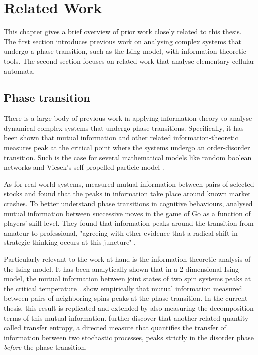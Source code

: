 \documentclass[12pt]{article}
\begin{document}
\newpage
\section{Related Work} 

This chapter gives a brief overview of prior work closely related to this thesis. The first section introduces previous work on analysing complex systems that undergo a phase transition, such as the Ising model, with information-theoretic tools. The second section focuses on related work that analyse elementary cellular automata.    

\subsection{Phase transition}

There is a large body of previous work in applying information theory to analyse dynamical complex systems that undergo phase transitions. Specifically, it has been shown that mutual information and other related information-theoretic measures peak at the critical point where the systems undergo an order-disorder transition. Such is the case for several mathematical models like random boolean networks \cite{lizier-rand-bool-nets} and Vicsek's self-propelled particle model \cite{mi-swarms}. 

As for real-world systems, \cite{mi-financial-markets} measured mutual information between pairs of selected stocks and found that the peaks in information take place around known market crashes. To better understand phase transitions in cognitive behaviours, \cite{mi-go} analysed mutual information between successive moves in the game of Go as a function of players' skill level. They found that information peaks around the transition from amateur to professional, "agreeing with other evidence that a radical shift in strategic thinking occurs at this juncture" \cite{mi-social-systems}. 

Particularly relevant to the work at hand is the information-theoretic analysis of the Ising model. It has been analytically shown that in a 2-dimensional Ising model, the mutual information between joint states of two spin systems peaks at the critical temperature \cite{mi-ising-analytic}. \cite{barnett-ising} show empirically  that mutual information measured between pairs of neighboring spins peaks at the phase transition. In the current thesis, this result is replicated and extended by also measuring the decomposition terms of this mutual information. \cite{barnett-ising} further discover that another related quantity called transfer entropy, a directed measure that quantifies the transfer of information between two stochastic processes, peaks strictly in the disorder phase \textit{before} the phase transition. 
\end{document}
